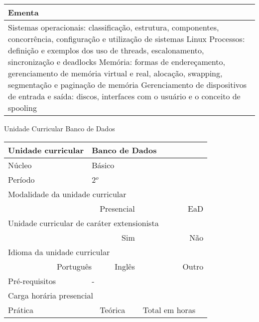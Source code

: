 \begin{quadro}[h!]
\begin{tabular}{|p{3cm} p{2cm} p{3cm} p{2cm} p{3cm} p{2cm}|}
\multicolumn{6}{|p{15cm}|}{\cellcolor{blue1} Ementa} \\\hline
\hline\multicolumn{6}{|p{15cm}|}{\scriptsize Sistemas operacionais: classificação, estrutura, componentes, concorrência, configuração e utilização de sistemas Linux Processos: definição e exemplos dos uso de threads, escalonamento, sincronização e deadlocks Memória: formas de endereçamento, gerenciamento de memória virtual e real, alocação, swapping, segmentação e paginação de memória Gerenciamento de dispositivos de entrada e saída: discos, interfaces com o usuário e o conceito de spooling}\\\hline
\hline
	\end{tabular}
\end{quadro}
\begin{quadro}[h!]
  \centering\scriptsize
\caption{Unidade Curricular Banco de Dados}
\label{ unit_9 }
\begin{tabular}{|p{3cm} p{2cm} p{3cm} p{2cm} p{3cm} p{2cm}|}\hline
\multicolumn{1}{|p{3cm}|}{\cellcolor{blue1} Unidade curricular} & \multicolumn{5}{p{9cm}|}{ Banco de Dados }\\\hline
\multicolumn{1}{|p{3cm}|}{\cellcolor{blue1} Núcleo} & \multicolumn{5}{p{11.5cm}|}{ Básico }\\\hline
\multicolumn{1}{|p{3cm}|}{\cellcolor{blue1} Período} & \multicolumn{5}{p{9cm}|}{ 2$^o$ }\\\hline
\multicolumn{6}{|p{15cm}|}{\cellcolor{blue1} Modalidade da unidade curricular} \\\hline
\multicolumn{2}{|r}{		} &  \multicolumn{2}{r}{Presencial \XBox } & \multicolumn{2}{r|}{EaD \Square	} \\\hline
\multicolumn{6}{|p{15cm}|}{\cellcolor{blue1} Unidade curricular de caráter extensionista} \\\hline
\multicolumn{4}{|r}{			Sim \Square	} & \multicolumn{2}{r|}{	Não \XBox	}\\\hline
\multicolumn{6}{|p{15cm}|}{\cellcolor{blue1} Idioma da unidade curricular} \\ \hline
\multicolumn{2}{|r}{	Português \XBox	} &  \multicolumn{2}{r}{	Inglês \Square	} & \multicolumn{2}{r|}{	Outro \Square	} \\ \hline
\multicolumn{1}{|p{3cm}|}{\cellcolor{blue1} Pré-requisitos} & \multicolumn{5}{p{9cm}|}{ - }\\ \hline
\multicolumn{6}{|p{15cm}|}{\cellcolor{blue1} Carga horária presencial} \\ \hline
\multicolumn{1}{|p{3cm}|}{\raggedleft Prática} & \multicolumn{1}{p{1cm}|}{\centering	30	} &  \multicolumn{1}{p{3cm}|}{\raggedleft Teórica}  & \multicolumn{1}{p{1cm}|}{\centering 	30 } & \multicolumn{1}{p{3cm}|}{\raggedleft Total em horas} & \multicolumn{1}{p{1cm}|}{\raggedleft	60	} \\ \hline

\end{tabular}
\end{quadro}
